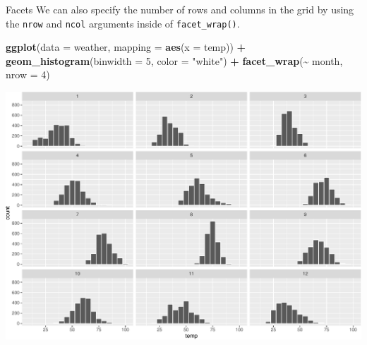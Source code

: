 \documentclass[
  ignorenonframetext,
]{beamer}
\newenvironment{Shaded}{\begin{snugshade}}{\end{snugshade}}
\newcommand{\AttributeTok}[1]{\textcolor[rgb]{0.13,0.29,0.53}{#1}}
\newcommand{\DecValTok}[1]{\textcolor[rgb]{0.00,0.00,0.81}{#1}}
\newcommand{\FunctionTok}[1]{\textcolor[rgb]{0.13,0.29,0.53}{\textbf{#1}}}
\newcommand{\NormalTok}[1]{#1}
\newcommand{\SpecialCharTok}[1]{\textcolor[rgb]{0.81,0.36,0.00}{\textbf{#1}}}
\newcommand{\StringTok}[1]{\textcolor[rgb]{0.31,0.60,0.02}{#1}}
\begin{document}
\begin{frame}[fragile]{Facets}
\protect\hypertarget{facets-2}{}
We can also specify the number of rows and columns in the grid by using
the \texttt{nrow} and \texttt{ncol} arguments inside of
\texttt{facet\_wrap()}.

\tiny

\begin{Shaded}
\begin{Highlighting}[]
\FunctionTok{ggplot}\NormalTok{(}\AttributeTok{data =}\NormalTok{ weather, }\AttributeTok{mapping =} \FunctionTok{aes}\NormalTok{(}\AttributeTok{x =}\NormalTok{ temp)) }\SpecialCharTok{+}
  \FunctionTok{geom\_histogram}\NormalTok{(}\AttributeTok{binwidth =} \DecValTok{5}\NormalTok{, }\AttributeTok{color =} \StringTok{"white"}\NormalTok{) }\SpecialCharTok{+}
  \FunctionTok{facet\_wrap}\NormalTok{(}\SpecialCharTok{\textasciitilde{}}\NormalTok{ month, }\AttributeTok{nrow =} \DecValTok{4}\NormalTok{)}
\end{Highlighting}
\end{Shaded}

\begin{center}\includegraphics[width=0.7\linewidth,height=0.6\textheight]{Week2_files/figure-beamer/unnamed-chunk-32-1} \end{center}
\normalsize
\end{frame}
\end{document}
